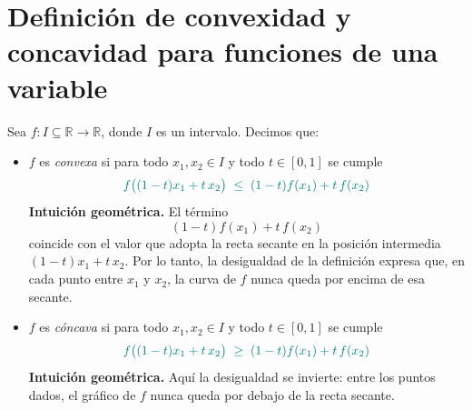 \documentclass{article}
\newcommand{\R}{\ensuremath{\mathbb{R}}}
\newcommand{\vect}[1]{\vec{#1}}
\begin{document}
\begin{center}
\hspace{1.2cm}
\end{center}

\section*{Definición de convexidad y concavidad para funciones de una variable}

Sea \(f\colon I\subseteq\R\to\R\), donde \(I\) es un intervalo. Decimos que:
\begin{itemize}
  \item \(f\) es \emph{convexa} si para todo \(x_{1},x_{2}\in I\) y todo \(t\in[0,1]\) se cumple
    \[
      \color{teal}
      f\bigl((1-t)x_{1} + t\,x_{2}\bigr)
      \;\le\;
      (1-t)f(x_{1}) + t\,f(x_{2})
    \]
    \noindent\textbf{Intuición geométrica.} El término
    \[
      (1-t)f(x_{1}) + t\,f(x_{2})
    \]
    coincide con el valor que adopta la recta secante en la posición intermedia
    \((1-t)x_{1}+t\,x_{2}\). Por lo tanto, la desigualdad de la definición expresa que, en cada punto entre \(x_1\) y \(x_2\), la curva de \(f\) nunca queda por encima de esa secante.

  \item \(f\) es \emph{cóncava} si para todo \(x_{1},x_{2}\in I\) y todo \(t\in[0,1]\) se cumple
    \[
      \color{teal}
      f\bigl((1-t)x_{1} + t\,x_{2}\bigr)
      \;\ge\;
      (1-t)f(x_{1}) + t\,f(x_{2})
    \]
    \noindent\textbf{Intuición geométrica.} Aquí la desigualdad se invierte: entre los puntos dados, el gráfico de \(f\) nunca queda por debajo de la recta secante.
\end{itemize}
\end{document}

